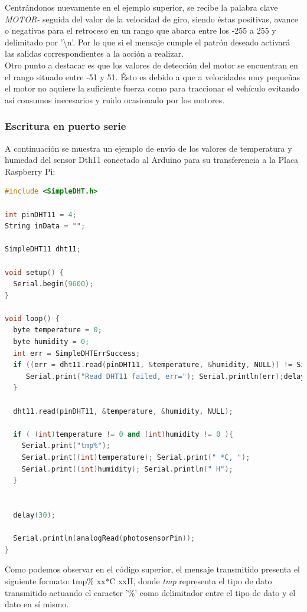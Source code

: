 Centrándonos nuevamente en el ejemplo superior, se recibe la palabra clave \emph{MOTOR-} seguida del valor de la velocidad de giro, siendo éstas positivas, avance o negativas para el retroceso en un rango
que abarca entre los -255 a 255 y delimitado por '\textbackslash n'. Por lo que si el mensaje cumple el patrón deseado activará las salidas correspondientes a la acción a realizar.\\

Otro punto a destacar es que los valores de detección del motor se encuentran en el rango situado entre -51 y 51. Ésto es debido a que a velocidades muy pequeñas el motor no aquiere la
suficiente fuerza como para traccionar el vehículo evitando así consumos inecesarios y ruido ocasionado por los motores.\\

\subsubsection{Escritura en puerto serie}

A continuación se muestra un ejemplo de envío de los valores de temperatura y humedad del sensor Dth11 conectado al Arduino para su transferencia a la Placa Raspberry Pi:\\

\begin{lstlisting}[language=C++]
#include <SimpleDHT.h>

int pinDHT11 = 4;
String inData = "";

SimpleDHT11 dht11;

void setup() {
  Serial.begin(9600);
}

void loop() {
  byte temperature = 0;
  byte humidity = 0;
  int err = SimpleDHTErrSuccess;
  if ((err = dht11.read(pinDHT11, &temperature, &humidity, NULL)) != SimpleDHTErrSuccess) {
     Serial.print("Read DHT11 failed, err="); Serial.println(err);delay(1000);
  }

  dht11.read(pinDHT11, &temperature, &humidity, NULL);

  if ( (int)temperature != 0 and (int)humidity != 0 ){
    Serial.print("tmp%");
    Serial.print((int)temperature); Serial.print(" *C, ");
    Serial.print((int)humidity); Serial.println(" H");
  }

  
  delay(30);

  Serial.println(analogRead(photosensorPin));
}

\end{lstlisting}

Como podemos observar en el código superior, el mensaje transmitido presenta el siguiente formato: tmp\% xx*C xxH, donde \emph{tmp} representa el tipo de dato transmitido actuando el caracter '\%' como 
delimitador entre el tipo de dato y el dato en sí mismo.\\


